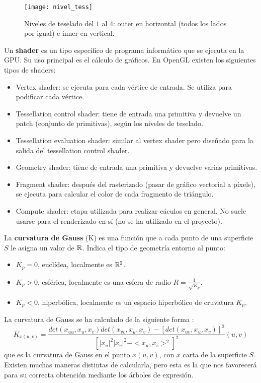 \begin{figure}[h]
  	\centering
  	\texttt{[image: nivel\_tess]}
	\caption{Niveles de teselado del $1$ al $4$: outer en horizontal (todos los lados por igual) e inner en vertical.}
  	\label{fig:nivel_tess}
\end{figure}

\begin{definicion} Un \textbf{shader} es un tipo específico de programa informático que se ejecuta en la GPU. Su uso principal es el cálculo de gráficos. En OpenGL existen los siguientes tipos de shaders:
	\begin{itemize}
		\item Vertex shader: se ejecuta para cada vértice de entrada. Se utiliza para podificar cada vértice.
		\item Tessellation control shader: tiene de entrada una primitiva y devuelve un patch (conjunto de primitivas), según los niveles de teselado.
		\item Tessellation evaluation shader: similar al vertex shader pero diseñado para la salida del tessellation control shader.
		\item Geometry shader: tiene de entrada una primitiva y devuelve varias primitivas.
		\item Fragment shader: después del rasterizado (pasar de gráfico vectorial a píxels), se ejecuta para calcular el color de cada fragmento de triángulo.
		\item Compute shader: etapa utilizada para realizar cáculos en general. No suele usarse para el renderizado en sí (no se ha utilizado en el proyecto).
	\end{itemize}
\end{definicion}

\begin{definicion} La \textbf{curvatura de Gauss} (K) es una función que a cada punto de una superficie $S$ le asigna un valor de $\mathbb{R}$. Indica el tipo de geometría entorno al punto:
	\begin{itemize}
		\item $K_p = 0$, euclídea, localmente es $\mathbb{R}^2$.
		\item $K_p > 0$, esférica, localmente es una esfera de radio $R = \frac{1}{\sqrt{K_p}}$.
		\item $K_p < 0$, hiperbólica, localmente es un espacio hiperbólico de cruvatura $K_p$.
	\end{itemize}
La curvatura de Gauss se ha calculado de la siguiente forma \cite{Wolfram}:
		$$K_{x(u,v)} = \frac{det(x_{uu}, x_u, x_v) det(x_{vv}, x_u, x_v) - [det(x_{uv}, x_u, x_v)]^2} {[|x_u|^2|x_v|^2 - <x_u, x_v>^2]^2} (u, v)$$
	que es la curvatura de Gauss en el punto $x(u, v)$, con $x$ carta de la superficie $S$. Existen muchas maneras distintas de calcularla, pero esta es la que nos favorecerá para su correcta obtención mediante los árboles de expresión.
\end{definicion}

\endinput
